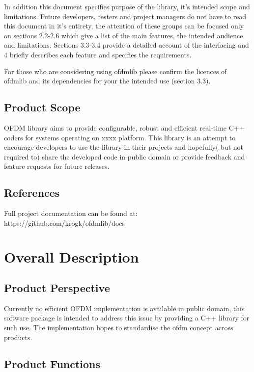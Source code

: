 \documentclass[]{report}
\begin{document}
In addition this document specifies purpose of the library, it's intended scope and limitations. Future developers, testers and project managers do not have to read this document in it's entirety, the attention of these groups can be focused only on sections 2.2-2.6 which give a list of the main features, the intended audience and limitations. Sections 3.3-3.4 provide a detailed account of the interfacing and 4 briefly describes each feature and specifies the requirements.

For those who are considering using ofdmlib please confirm the licences of ofdmlib and its dependencies for your the intended use (section 3.3).


\subsection{Product Scope}

OFDM library aims to provide configurable, robust and efficient real-time C++ coders for systems operating on xxxx platform. This library is an attempt to encourage developers to use the library in their projects and hopefully( but not required to) share the developed code in public domain or provide feedback and feature requests for future releases.

\subsection{References}

Full project documentation can be found at: https://github.com/krogk/ofdmlib/docs

\pagebreak
\section{Overall Description}

\subsection{Product Perspective}

Currently no efficient OFDM implementation is available in public domain, this software package is intended to address this issue by providing a C++ library for such use. The implementation hopes to standardise the ofdm concept across products. 


\subsection{Product Functions}
\end{document}
